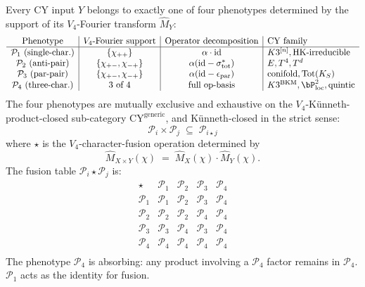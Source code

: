 \begin{theorem}
\label{thm:v4-cy-direction-classification}
Every CY input $Y$ belongs to exactly one of four phenotypes determined by
the support of its $V_4$-Fourier transform $\hat{M}_Y$:
\[
 \begin{array}{c|c|c|l}
 \text{Phenotype} & \text{$V_4$-Fourier support} & \text{Operator decomposition} & \text{CY family} \\
 \hline
 \mathcal{P}_1 \text{ (single-char.)} & \{\chi_{++}\} & \alpha \cdot \mathrm{id} & K3^{[n]}, \mathrm{HK}\text{-irreducible} \\
 \mathcal{P}_2 \text{ (anti-pair)} & \{\chi_{+-}, \chi_{-+}\} & \alpha (\mathrm{id} - \sigma_{\mathrm{tot}}^*) & E, T^4, T^d \\
 \mathcal{P}_3 \text{ (par-pair)} & \{\chi_{+-}, \chi_{-+}\} & \alpha (\mathrm{id} - \epsilon_{\mathrm{par}}) & \text{conifold}, \mathrm{Tot}(K_S) \\
 \mathcal{P}_4 \text{ (three-char.)} & 3\text{ of }4 & \text{full op-basis} & K3^{\mathrm{BKM}}, \bP^2_{\mathrm{loc}}, \text{quintic} \\
 \end{array}
\]
The four phenotypes are mutually exclusive and exhaustive on the
$V_4$-Künneth-product-closed sub-category $\mathrm{CY}^{\mathrm{generic}}$,
and Künneth-closed in the strict sense:
\[
 \mathcal{P}_i \times \mathcal{P}_j \;\subseteq\; \mathcal{P}_{i \star j}
\]
where $\star$ is the $V_4$-character-fusion operation determined by
\[
 \hat{M}_{X \times Y}(\chi) \;=\; \hat{M}_X(\chi) \cdot \hat{M}_Y(\chi).
\]
The fusion table $\mathcal{P}_i \star \mathcal{P}_j$ is:
\[
 \begin{array}{c|cccc}
 \star & \mathcal{P}_1 & \mathcal{P}_2 & \mathcal{P}_3 & \mathcal{P}_4 \\
 \hline
 \mathcal{P}_1 & \mathcal{P}_1 & \mathcal{P}_2 & \mathcal{P}_3 & \mathcal{P}_4 \\
 \mathcal{P}_2 & \mathcal{P}_2 & \mathcal{P}_2 & \mathcal{P}_4 & \mathcal{P}_4 \\
 \mathcal{P}_3 & \mathcal{P}_3 & \mathcal{P}_4 & \mathcal{P}_3 & \mathcal{P}_4 \\
 \mathcal{P}_4 & \mathcal{P}_4 & \mathcal{P}_4 & \mathcal{P}_4 & \mathcal{P}_4 \\
 \end{array}
\]
The phenotype $\mathcal{P}_4$ is absorbing: any product involving a
$\mathcal{P}_4$ factor remains in $\mathcal{P}_4$. $\mathcal{P}_1$ acts
as the identity for fusion.
\end{theorem}

